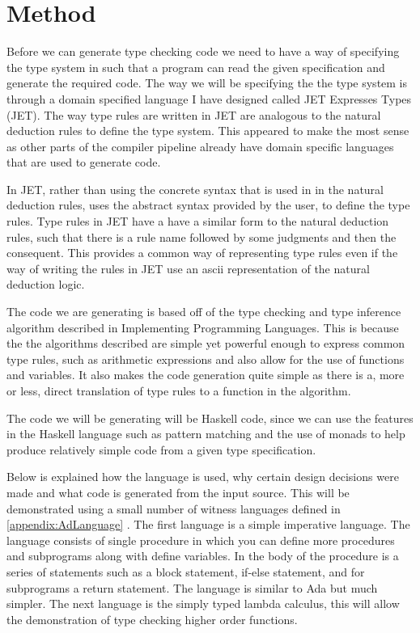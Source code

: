 \chapter{Method}
Before we can generate type checking code we need to have a way of specifying the type system in such that a program can read the given specification and generate the required code.
The way we will be specifying the the type system is through a domain specified language I have designed called JET Expresses Types (JET).
The way type rules are written in JET are analogous to the natural deduction rules to define the type system.
This appeared to make the most sense as other parts of the compiler pipeline already have domain specific languages that are used to generate code.

In JET, rather than using the concrete syntax that is used in in the natural deduction rules, uses the abstract syntax provided by the user, to define the type rules.
Type rules in JET have a have a similar form to the natural deduction rules, such that there is a rule name followed by some judgments and then the consequent.
This provides a common way of representing type rules even if the way of writing the rules in JET use an ascii representation of the natural deduction logic.

The code we are generating is based off of the type checking and type inference algorithm described in Implementing Programming Languages\cite{ranta2012implementing}.
This is because the the algorithms described are simple yet powerful enough to express common type rules, such as arithmetic expressions and also allow for the use of functions and variables.
It also makes the code generation quite simple as there is a, more or less, direct translation of type rules to a function in the algorithm.

The code we will be generating will be Haskell code, since we can use the features in the Haskell language such as pattern matching and the use of monads to help produce relatively simple code from a given type specification.

Below is explained how the language is used, why certain design decisions were made and what code is generated from the input source. 
This will be demonstrated using a small number of  witness languages defined in \autoref{appendix:AdLanguage} .
The first language is a simple imperative language. 
The language consists of single procedure in which you can define more procedures and subprograms along with define variables. In the body of the procedure is a series of statements such as a block statement, if-else statement, and for subprograms a return statement. The language is similar to Ada but much simpler.
The next language is the simply typed lambda calculus, this will allow the demonstration of type checking higher order functions.


